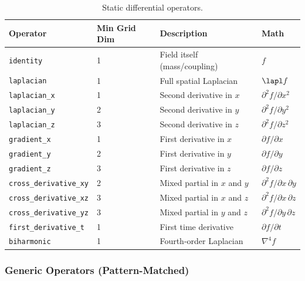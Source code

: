 \begin{table}[htbp]
\centering
\caption{Static differential operators.}
\label{tab:json-static-operators}
\begin{tabular}{@{}llll@{}}
\toprule
Operator & Min Grid Dim & Description & Math \\
\midrule
\texttt{identity}            & 1 & Field itself (mass/coupling)    & $f$ \\
\texttt{laplacian}           & 1 & Full spatial Laplacian          & $\lapl f$ \\
\texttt{laplacian\_x}         & 1 & Second derivative in $x$        & $\partial^2 f / \partial x^2$ \\
\texttt{laplacian\_y}         & 2 & Second derivative in $y$        & $\partial^2 f / \partial y^2$ \\
\texttt{laplacian\_z}         & 3 & Second derivative in $z$        & $\partial^2 f / \partial z^2$ \\
\texttt{gradient\_x}          & 1 & First derivative in $x$         & $\partial f / \partial x$ \\
\texttt{gradient\_y}          & 2 & First derivative in $y$         & $\partial f / \partial y$ \\
\texttt{gradient\_z}          & 3 & First derivative in $z$         & $\partial f / \partial z$ \\
\texttt{cross\_derivative\_xy} & 2 & Mixed partial in $x$ and $y$    & $\partial^2 f / \partial x\, \partial y$ \\
\texttt{cross\_derivative\_xz} & 3 & Mixed partial in $x$ and $z$    & $\partial^2 f / \partial x\, \partial z$ \\
\texttt{cross\_derivative\_yz} & 3 & Mixed partial in $y$ and $z$    & $\partial^2 f / \partial y\, \partial z$ \\
\texttt{first\_derivative\_t}  & 1 & First time derivative           & $\partial f / \partial t$ \\
\texttt{biharmonic}          & 1 & Fourth-order Laplacian          & $\nabla^4 f$ \\
\bottomrule
\end{tabular}
\end{table}

\subsubsection{Generic Operators (Pattern-Matched)}
\label{sec:json-generic-operators}

